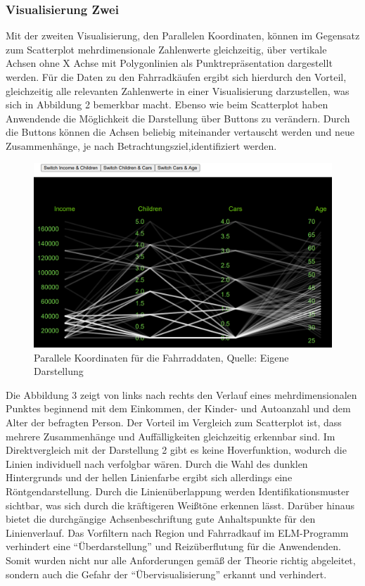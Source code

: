 \documentclass[usegeometry=true]{scrartcl}
\begin{document}
\subsubsection{Visualisierung Zwei}
Mit der zweiten Visualisierung, den Parallelen Koordinaten, können im Gegensatz zum Scatterplot mehrdimensionale Zahlenwerte gleichzeitig, über vertikale Achsen ohne X Achse mit Polygonlinien als Punktrepräsentation dargestellt werden.
Für die Daten zu den Fahrradkäufen ergibt sich hierdurch den Vorteil, gleichzeitig alle relevanten Zahlenwerte in einer Visualisierung darzustellen, was sich in Abbildung 2 bemerkbar macht. Ebenso wie beim Scatterplot haben Anwendende die Möglichkeit die Darstellung über Buttons zu verändern. Durch die Buttons können die Achsen beliebig miteinander vertauscht werden und neue Zusammenhänge, je nach Betrachtungsziel,identifiziert werden. 
\begin{figure}[h]
\begin{center}
\includegraphics[width=16cm]{Bilder/V2ParalleleKoordinaten.png}
\caption{Parallele Koordinaten für die Fahrraddaten, Quelle: Eigene Darstellung}
\end{center}
\end{figure}
\newline
Die Abbildung 3 zeigt von links nach rechts den Verlauf eines mehrdimensionalen Punktes beginnend mit dem Einkommen, der Kinder- und Autoanzahl und dem Alter der befragten Person. Der Vorteil im Vergleich zum Scatterplot ist, dass mehrere Zusammenhänge und Auffälligkeiten gleichzeitig erkennbar sind. Im Direktvergleich mit der Darstellung 2 gibt es keine Hoverfunktion, wodurch die Linien individuell nach verfolgbar wären. Durch die Wahl des dunklen Hintergrunds und der hellen Linienfarbe ergibt sich allerdings eine Röntgendarstellung. Durch die Linienüberlappung werden Identifikationsmuster sichtbar, was sich durch die kräftigeren Weißtöne erkennen lässt. Darüber hinaus bietet die durchgängige Achsenbeschriftung gute Anhaltspunkte für den Linienverlauf. Das Vorfiltern nach Region und Fahrradkauf im ELM-Programm verhindert eine "`Überdarstellung"' und Reizüberflutung für die Anwendenden. Somit wurden nicht nur alle Anforderungen gemäß der Theorie richtig abgeleitet, sondern auch die Gefahr der "`Übervisualisierung"' erkannt und verhindert.
\end{document}
